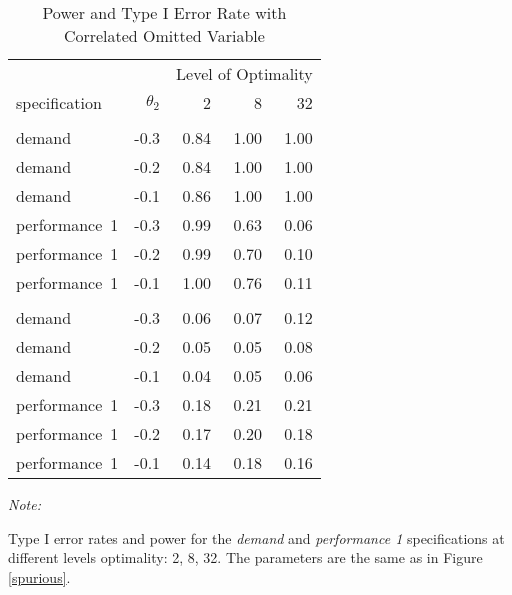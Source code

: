 \begin{table}

\caption{\label{tab:spurious-table}Power and Type I Error Rate with Correlated Omitted Variable}
\centering
\fontsize{9}{11}\selectfont
\begin{threeparttable}
\begin{tabular}[t]{lrrrr}
\toprule
\multicolumn{1}{c}{ } & \multicolumn{1}{c}{ } & \multicolumn{3}{c}{Level of Optimality} \\
\cmidrule(l{3pt}r{3pt}){3-5}
specification & $\theta_2$ & 2 & 8 & 32\\
\midrule
\addlinespace[0.3em]
\multicolumn{5}{c}{\textbf{Power}}\\
\hspace{1em}demand & -0.3 & 0.84 & 1.00 & 1.00\\
\hspace{1em}demand & -0.2 & 0.84 & 1.00 & 1.00\\
\hspace{1em}demand & -0.1 & 0.86 & 1.00 & 1.00\\
\hspace{1em}performance~1 & -0.3 & 0.99 & 0.63 & 0.06\\
\hspace{1em}performance~1 & -0.2 & 0.99 & 0.70 & 0.10\\
\hspace{1em}performance~1 & -0.1 & 1.00 & 0.76 & 0.11\\
\addlinespace[0.3em]
\multicolumn{5}{c}{\textbf{Type I}}\\
\hspace{1em}demand & -0.3 & 0.06 & 0.07 & 0.12\\
\hspace{1em}demand & -0.2 & 0.05 & 0.05 & 0.08\\
\hspace{1em}demand & -0.1 & 0.04 & 0.05 & 0.06\\
\hspace{1em}performance~1 & -0.3 & 0.18 & 0.21 & 0.21\\
\hspace{1em}performance~1 & -0.2 & 0.17 & 0.20 & 0.18\\
\hspace{1em}performance~1 & -0.1 & 0.14 & 0.18 & 0.16\\
\bottomrule
\end{tabular}
\begin{tablenotes}
\item \textit{Note: } 
\item Type I error rates and power for the \emph{demand}
            and \emph{performance 1} specifications at different
            levels optimality: 2, 8, 32. The
            parameters are the same as in Figure
            \ref{spurious}.
\end{tablenotes}
\end{threeparttable}
\end{table}